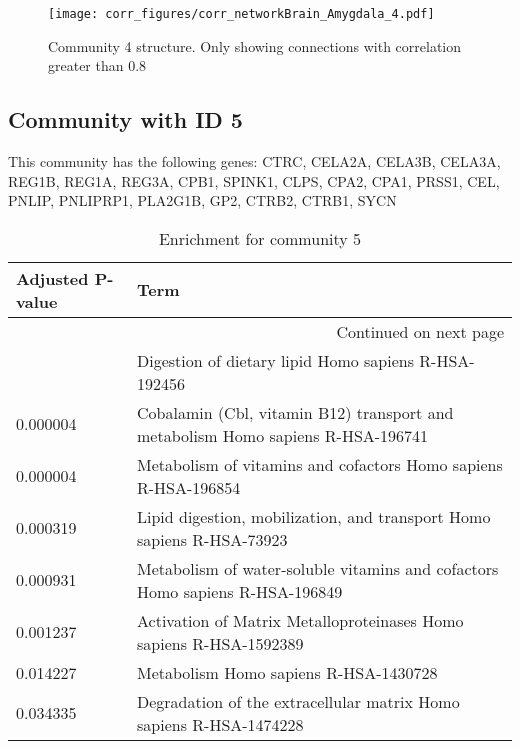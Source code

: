 \begin{figure}[h!]
\centering
\texttt{[image: corr\_figures/corr\_networkBrain\_Amygdala\_4.pdf]}
\caption{Community 4 structure. Only showing connections with correlation greater than 0.8}
\end{figure}




\subsection*{Community with ID 5}
This community has the following genes: CTRC, CELA2A, CELA3B, CELA3A, REG1B, REG1A, REG3A, CPB1, SPINK1, CLPS, CPA2, CPA1, PRSS1, CEL, PNLIP, PNLIPRP1, PLA2G1B, GP2, CTRB2, CTRB1, SYCN
\\
\begin{longtable}{p{2.4cm}p{14.5cm}}
\caption{Enrichment for community 5}\\
\toprule
Adjusted \newline P-value &                                                                             Term \\
\midrule
\endhead
\midrule
\multicolumn{2}{r}{{Continued on next page}} \\
\midrule
\endfoot

\bottomrule
\endlastfoot
                 0.000003 &                             Digestion of dietary lipid Homo sapiens R-HSA-192456 \\
                 0.000004 &  Cobalamin (Cbl, vitamin B12) transport and metabolism Homo sapiens R-HSA-196741 \\
                 0.000004 &                   Metabolism of vitamins and cofactors Homo sapiens R-HSA-196854 \\
                 0.000319 &            Lipid digestion, mobilization, and transport Homo sapiens R-HSA-73923 \\
                 0.000931 &     Metabolism of water-soluble vitamins and cofactors Homo sapiens R-HSA-196849 \\
                 0.001237 &               Activation of Matrix Metalloproteinases Homo sapiens R-HSA-1592389 \\
                 0.014227 &                                            Metabolism Homo sapiens R-HSA-1430728 \\
                 0.034335 &               Degradation of the extracellular matrix Homo sapiens R-HSA-1474228 \\
\end{longtable}


